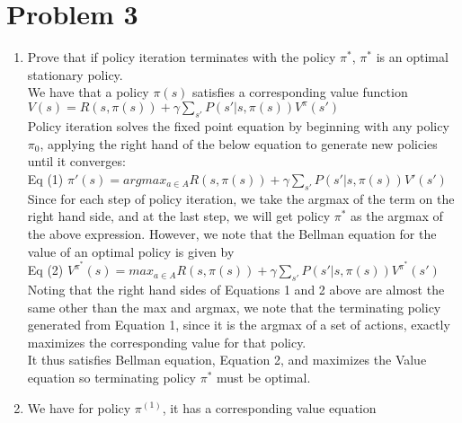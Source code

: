 \documentclass[12pt,letterpaper]{article}
\begin{document}
\section*{Problem 3}
\begin{enumerate}[label={(\alph*) }]
        \item Prove that if policy iteration terminates with the policy $\pi^*$, $\pi^*$ is an optimal stationary policy. \\

We have that a policy $\pi(s)$ satisfies a corresponding value function \\ $\displaystyle{V(s) = R(s, \pi(s)) + \gamma \sum_{s'}{P(s' | s, \pi(s))V^{\pi}(s')}}$ \\

Policy iteration solves the fixed point equation by beginning with any policy $\pi_0$, applying the right hand of the below equation to generate new policies until it converges: \\

Eq (1) $\displaystyle{\pi '(s) = argmax_{a \in A} R(s, \pi(s)) + \gamma \sum_{s'}{P(s' | s, \pi(s))V'(s')}}$ \\

Since for each step of policy iteration, we take the argmax of the term on the right hand side, and at the last step, we will get policy $\pi^*$ as the argmax of the above expression. However, we note that the Bellman equation for the value of an optimal policy is given by \\

Eq (2) $\displaystyle{V^{\pi^*}(s) = max_{a \in A} R(s, \pi(s)) + \gamma \sum_{s'}{P(s' | s, \pi(s))V^{\pi^*}(s')}}$ \\

Noting that the right hand sides of Equations 1 and 2 above are almost the same other than the max and argmax, we note that the terminating policy generated from Equation 1, since it is the argmax of a set of actions, exactly maximizes the corresponding value for that policy. \\

It thus satisfies Bellman equation, Equation 2, and maximizes the Value equation so terminating policy $\pi^*$ must be optimal. \\

\item

We have for policy $\pi^{(1)}$, it has a corresponding value equation \\


\end{enumerate}
\end{document}
